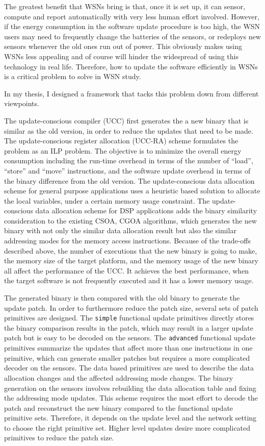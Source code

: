 The greatest benefit that WSNs bring is that, once it is set up, it can sensor, compute and report automatically with 
very less human effort involved. However, if the energy consumption in the software update procedure is too high, the 
WSN users may need to frequently change the batteries of the sensors, or redeploys new sensors  whenever the old ones 
run out of power. This obviously makes using WSNs less appealing and of course will hinder the widespread of using this 
technology in real life. Therefore, how to update the software efficiently in WSNs is a critical  problem to solve in 
WSN study.

In my thesis, I designed a framework that tacks this problem down from different viewpoints. 

The update-conscious compiler (UCC) first generates the a new binary that is similar as the old version, in order to 
reduce the updates that need to be made. The update-conscious register allocation (UCC-RA) scheme formulates the 
problem as an ILP problem. The objective is to minimize the overall energy consumption including the run-time overhead 
in terms of the number of ``load'', ``store'' and ``move'' instructions, and the software update overhead in terms of 
the binary difference from the old version. The update-conscious data allocation scheme for general purpose 
applications uses a heuristic based solution to allocate the local variables, under a certain memory usage constraint. 
The update-conscious data allocation scheme for DSP applications adds the binary similarity consideration to the 
existing CSOA, CGOA algorithms, which generates the new binary with not only the similar data allocation result but 
also the similar addressing modes for the memory access instructions.
Because of the trade-offs described above, the number of executions that the new binary is going to make, the memory 
size of the target platform, and the memory usage of the new binary all affect the performance of the UCC. It achieves the 
best performance, when the target software is not frequently executed and it has a lower memory usage. 

The generated binary is then compared with the old binary to generate the update patch. In order to furthermore reduce 
the patch size, several sets of patch primitives are designed. The {\tt simple} functional update primitives directly 
stores the binary comparison results in the patch, which may result in a larger update patch but is easy to be decoded 
on the sensors. The {\tt advanced} functional update primitives summarize the updates that affect more than one 
instructions in one primitive, which can generate smaller patches but requires a more complicated decoder on the 
sensors. The data based primitives are used to describe the data allocation changes and the affected addressing mode 
changes. The binary generation on the sensors involves rebuilding the data allocation table and fixing the addressing 
mode updates. This scheme requires the most effort to decode the patch and reconstruct the new binary compared to the 
functional update primitive sets. 
Therefore, it depends on the update level and the network setting to choose the right primitive set. Higher level 
updates desire more complicated primitives to reduce the patch size.

